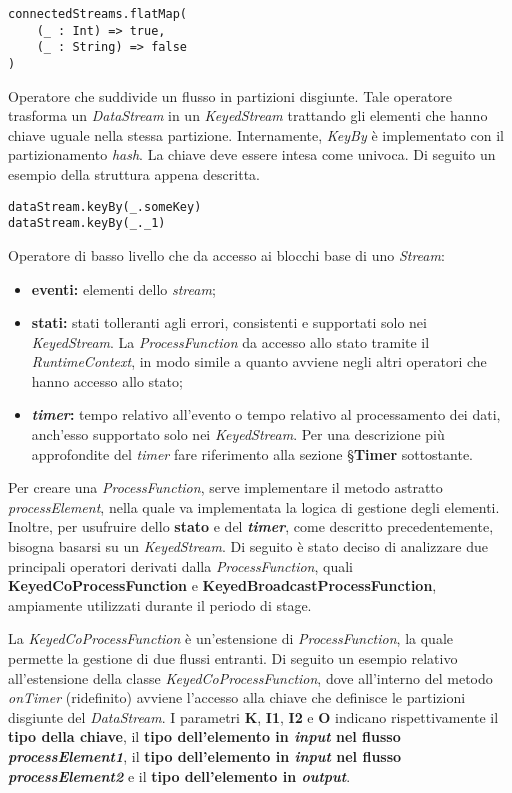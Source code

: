 \begin{verbatim}
connectedStreams.flatMap(
    (_ : Int) => true,
    (_ : String) => false
)
\end{verbatim}

Operatore che suddivide un flusso in partizioni disgiunte. Tale operatore trasforma un \textit{DataStream} in un \textit{KeyedStream} trattando gli elementi che hanno chiave uguale nella stessa partizione. Internamente, \textit{KeyBy} è implementato con il partizionamento \textit{hash}.
La chiave deve essere intesa come univoca.
Di seguito un esempio della struttura appena descritta.
\begin{verbatim}
dataStream.keyBy(_.someKey)
dataStream.keyBy(_._1)
\end{verbatim}

Operatore di basso livello che da accesso ai blocchi base di uno \textit{Stream}:
\begin{itemize}
	\item{\textbf{eventi:} elementi dello \textit{stream};}
	\item{\textbf{stati:} stati tolleranti agli errori, consistenti e supportati solo nei \textit{KeyedStream}. La \textit{ProcessFunction} da accesso allo stato tramite il \textit{RuntimeContext}, in modo simile a quanto avviene negli altri operatori che hanno accesso allo stato;}
	\item{\textbf{\textit{timer}:} tempo relativo all'evento o tempo relativo al processamento dei dati, anch'esso supportato solo nei \textit{KeyedStream}. Per una descrizione più approfondite del \textit{timer} fare riferimento alla sezione \S\textbf{Timer} sottostante.}
\end{itemize}

Per creare una \textit{ProcessFunction}, serve implementare il metodo astratto \textit{processElement}, nella quale va implementata la logica di gestione degli elementi. Inoltre, per usufruire dello \textbf{stato} e del \textbf{\textit{timer}}, come descritto precedentemente, bisogna basarsi su un \textit{KeyedStream}. Di seguito è stato deciso di analizzare due principali operatori derivati dalla \textit{ProcessFunction}, quali \textbf{KeyedCoProcessFunction} e \textbf{KeyedBroadcastProcessFunction}, ampiamente utilizzati durante il periodo di stage.

La \textit{KeyedCoProcessFunction} è un'estensione di \textit{ProcessFunction}, la quale permette la gestione di due flussi entranti. Di seguito un esempio relativo all'estensione della classe \textit{KeyedCoProcessFunction}, dove all'interno del metodo \textit{onTimer} (ridefinito) avviene l'accesso alla chiave che definisce le partizioni disgiunte del \textit{DataStream}. I parametri \textbf{K}, \textbf{I1}, \textbf{I2} e \textbf{O} indicano rispettivamente il \textbf{tipo della chiave}, il \textbf{tipo dell'elemento in \textit{input} nel flusso \textit{processElement1}}, il \textbf{tipo dell'elemento in \textit{input} nel flusso \textit{processElement2}} e il \textbf{tipo dell'elemento in \textit{output}}.

